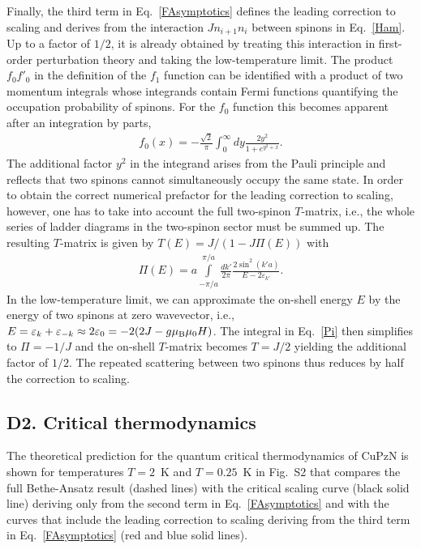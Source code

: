 \documentclass[12pt]{article}
\begin{document}
Finally, the third term in Eq.~\eqref{FAsymptotics} defines the leading correction to scaling and derives from the interaction $J n_{i+1} n_i$ between spinons in Eq.~\eqref{Ham}. Up to a factor of $1/2$, it is already obtained by treating this interaction in first-order perturbation theory and taking the low-temperature limit. The product $f_0 f'_0$ in the definition of the $f_1$ function can be identified with a product of two momentum integrals whose integrands contain Fermi functions quantifying the occupation probability of spinons. For the $f_0$ function this becomes apparent after an integration by parts,
%
\begin{align}
f_0(x) = - \frac{\sqrt{2}}{\pi} \int_0^\infty dy \frac{2 y^2}{1 + e^{y^2 + x}}.
\end{align}
%
The additional factor $y^2$ in the integrand arises from the Pauli principle and reflects that two spinons cannot simultaneously occupy the same state. 
%
In order to obtain the correct numerical prefactor for the leading correction to scaling, however, one has to take into account the full two-spinon $T$-matrix, i.e., the whole series of ladder diagrams in the two-spinon sector must be summed up. The resulting $T$-matrix is given by $T(E) = J/(1 - J \Pi(E))$ with 
%
\begin{align} \label{Pi}
\Pi(E) = a \int \limits^{\pi/a}_{-\pi/a} \frac{dk'}{2\pi} \frac{2 \sin^2(k' a)}{E - 2 \varepsilon_{k'}}.
\end{align}
%
In the low-temperature limit, we can approximate the on-shell energy $E$ by the energy of two spinons at zero wavevector, i.e., $E = \varepsilon_k + \varepsilon_{-k} \approx 2 \varepsilon_0 = -2(2J - g\mu_{\rm B} \mu_0 H)$. The integral in Eq.~\eqref{Pi} then simplifies to $\Pi = - 1/J$ and the on-shell $T$-matrix becomes $T = J/2$ yielding the additional factor of $1/2$. The repeated scattering between two spinons thus reduces by half the correction to scaling.

\subsection*{D2. Critical thermodynamics}


The theoretical prediction for the quantum critical thermodynamics of CuPzN is shown for temperatures $T  = 2$~K and $T = 0.25$~K in Fig.~{S2} that compares the full Bethe-Ansatz result (dashed lines) with the critical scaling curve (black solid line) deriving only from the second term in Eq.~\eqref{FAsymptotics} and with the curves that include the leading correction to scaling deriving from the third term in Eq.~\eqref{FAsymptotics} (red and blue solid lines).
\end{document}
